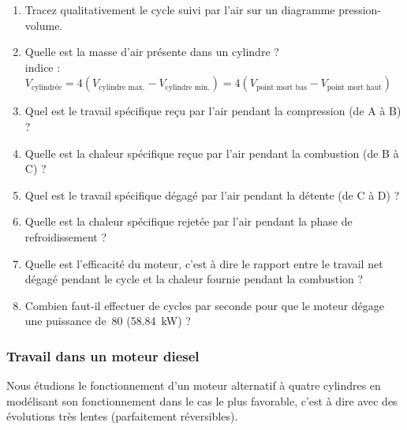 	\begin{enumerate}
		\item Tracez qualitativement le cycle suivi par l’air sur un diagramme pression-volume.
		\item {Quelle est la masse d’air présente dans un cylindre ?\\
				{\tiny indice : $V_\text{cylindrée} = 4 (V_\text{cylindre max.} - V_\text{cylindre min.}) = 4 (V_\text{point mort bas} - V_\text{point mort haut})$}}
		\item Quel est le travail spécifique reçu par l’air pendant la compression (de A à B) ?
		\item Quelle est la chaleur spécifique reçue par l’air pendant la combustion (de B à C) ?
		\item Quel est le travail spécifique dégagé par l’air pendant la détente (de C à D) ?
		\item Quelle est la chaleur spécifique rejetée par l’air pendant la phase de refroidissement ?
		\item Quelle est l’efficacité du moteur, c’est à dire le rapport entre le travail net dégagé pendant le cycle et la chaleur fournie pendant la combustion ?
		\item Combien faut-il effectuer de cycles par seconde pour que le moteur dégage une puissance de~\SI{80}{\cheval} (\SI{58,84}{\kilo\watt}) ?
	\end{enumerate}



\subsubsection{Travail dans un moteur diesel}
\label{exo_quatre_cylindres}
	
	Nous étudions le fonctionnement d’un moteur alternatif à quatre cylindres en modélisant son fonctionnement dans le cas le plus favorable, c’est à dire avec des évolutions très lentes (parfaitement réversibles).


